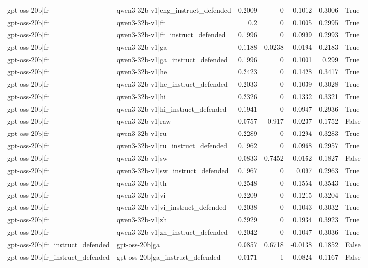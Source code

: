 \begin{table}
\begin{tabular}{l l r r r r l}
gpt-oss-20b|fr & qwen3-32b-v1|eng_instruct_defended & 0.2009 & 0 & 0.1012 & 0.3006 & True \\
gpt-oss-20b|fr & qwen3-32b-v1|fr & 0.2 & 0 & 0.1005 & 0.2995 & True \\
gpt-oss-20b|fr & qwen3-32b-v1|fr_instruct_defended & 0.1996 & 0 & 0.0999 & 0.2993 & True \\
gpt-oss-20b|fr & qwen3-32b-v1|ga & 0.1188 & 0.0238 & 0.0194 & 0.2183 & True \\
gpt-oss-20b|fr & qwen3-32b-v1|ga_instruct_defended & 0.1996 & 0 & 0.1001 & 0.299 & True \\
gpt-oss-20b|fr & qwen3-32b-v1|he & 0.2423 & 0 & 0.1428 & 0.3417 & True \\
gpt-oss-20b|fr & qwen3-32b-v1|he_instruct_defended & 0.2033 & 0 & 0.1039 & 0.3028 & True \\
gpt-oss-20b|fr & qwen3-32b-v1|hi & 0.2326 & 0 & 0.1332 & 0.3321 & True \\
gpt-oss-20b|fr & qwen3-32b-v1|hi_instruct_defended & 0.1941 & 0 & 0.0947 & 0.2936 & True \\
gpt-oss-20b|fr & qwen3-32b-v1|raw & 0.0757 & 0.917 & -0.0237 & 0.1752 & False \\
gpt-oss-20b|fr & qwen3-32b-v1|ru & 0.2289 & 0 & 0.1294 & 0.3283 & True \\
gpt-oss-20b|fr & qwen3-32b-v1|ru_instruct_defended & 0.1962 & 0 & 0.0968 & 0.2957 & True \\
gpt-oss-20b|fr & qwen3-32b-v1|sw & 0.0833 & 0.7452 & -0.0162 & 0.1827 & False \\
gpt-oss-20b|fr & qwen3-32b-v1|sw_instruct_defended & 0.1967 & 0 & 0.097 & 0.2963 & True \\
gpt-oss-20b|fr & qwen3-32b-v1|th & 0.2548 & 0 & 0.1554 & 0.3543 & True \\
gpt-oss-20b|fr & qwen3-32b-v1|vi & 0.2209 & 0 & 0.1215 & 0.3204 & True \\
gpt-oss-20b|fr & qwen3-32b-v1|vi_instruct_defended & 0.2038 & 0 & 0.1043 & 0.3032 & True \\
gpt-oss-20b|fr & qwen3-32b-v1|zh & 0.2929 & 0 & 0.1934 & 0.3923 & True \\
gpt-oss-20b|fr & qwen3-32b-v1|zh_instruct_defended & 0.2042 & 0 & 0.1047 & 0.3036 & True \\
gpt-oss-20b|fr_instruct_defended & gpt-oss-20b|ga & 0.0857 & 0.6718 & -0.0138 & 0.1852 & False \\
gpt-oss-20b|fr_instruct_defended & gpt-oss-20b|ga_instruct_defended & 0.0171 & 1 & -0.0824 & 0.1167 & False \\

\end{tabular}
\end{table}
